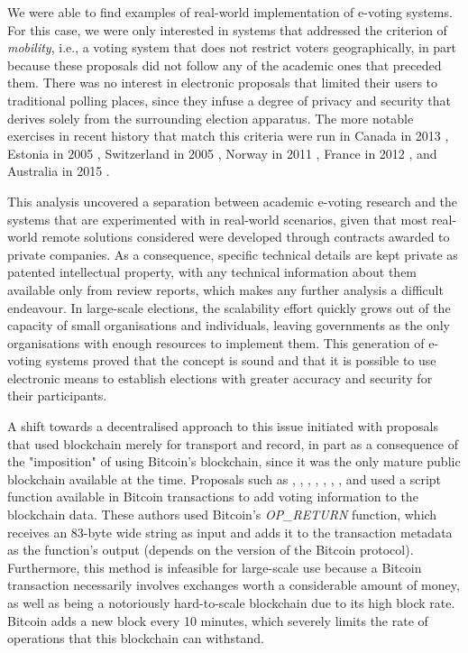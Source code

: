 \documentclass[../main.tex]{subfiles}
\begin{document}
\par
We were able to find examples of real-world implementation of e-voting systems. For this case, we were only interested in systems that addressed the criterion of \textit{mobility}, i.e., a voting system that does not restrict voters geographically, in part because these proposals did not follow any of the academic ones that preceded them. There was no interest in electronic proposals that limited their users to traditional polling places, since they infuse a degree of privacy and security that derives solely from the surrounding election apparatus. The more notable exercises in recent history that match this criteria were run in Canada in 2013 \cite{Goodman2014}, Estonia in 2005 \cite{Heiberg2005}, Switzerland in 2005 \cite{Binder2019}, Norway in 2011 \cite{Barrat2012}, France in 2012 \cite{Pinault2012}, and Australia in 2015 \cite{Halderman2015}.
\par
This analysis uncovered a separation between academic e-voting research and the systems that are experimented with in real-world scenarios, given that most real-world remote solutions considered were developed through contracts awarded to private companies. As a consequence, specific technical details are kept private as patented intellectual property, with any technical information about them available only from review reports, which makes any further analysis a difficult endeavour. In large-scale elections, the scalability effort quickly grows out of the capacity of small organisations and individuals, leaving governments as the only organisations with enough resources to implement them. This generation of e-voting systems proved that the concept is sound and that it is possible to use electronic means to establish elections with greater accuracy and security for their participants.
\par
A shift towards a decentralised approach to this issue initiated with proposals that used blockchain merely for transport and record, in part as a consequence of the "imposition" of using Bitcoin's blockchain, since it was the only mature public blockchain available at the time. Proposals such as \cite{Zhao2016}, \cite{Cruz2016}, \cite{Bistarelli2017}, \cite{Lee2017}, \cite{Shaheen2017}, \cite{Wu2017}, \cite{Dimitriou2020}, and \cite{Bartolucci2018} used a script function available in Bitcoin transactions to add voting information to the blockchain data. These authors used Bitcoin's \textit{OP\_RETURN} function, which receives an 83-byte wide string as input and adds it to the transaction metadata as the function's output (depends on the version of the Bitcoin protocol). Furthermore, this method is infeasible for large-scale use because a Bitcoin transaction necessarily involves exchanges worth a considerable amount of money, as well as being a notoriously hard-to-scale blockchain due to its high block rate. Bitcoin adds a new block every 10 minutes, which severely limits the rate of operations that this blockchain can withstand.
\end{document}
